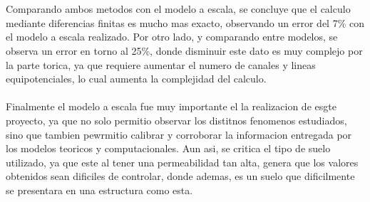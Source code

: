 \\ \\
Comparando ambos metodos con el modelo a escala, se concluye que el calculo mediante diferencias finitas es mucho mas exacto, observando un error del 7\% con el modelo a escala realizado. Por otro lado, y comparando entre modelos, se observa un error en torno al 25\%, donde disminuir este dato es muy complejo por la parte torica, ya que requiere aumentar el numero de canales y lineas equipotenciales, lo cual aumenta la complejidad del calculo.
\\ \\
Finalmente el modelo a escala fue muy importante el la realizacion de esgte proyecto, ya que no solo permitio observar los distitnos fenomenos estudiados, sino que tambien pewrmitio calibrar y corroborar la informacion entregada por los modelos teoricos y computacionales. Aun asi, se critica el tipo de suelo utilizado, ya que este al tener una permeabilidad tan alta, genera que los valores obtenidos sean dificiles de controlar, donde ademas, es un suelo que dificilmente se presentara en una estructura como esta.
\\ \\
